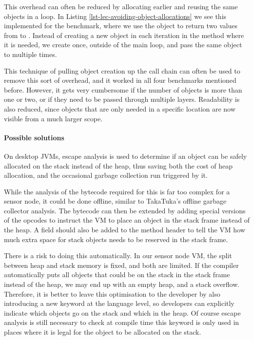 This overhead can often be reduced by allocating earlier and reusing the same objects in a loop. In Listing \ref{lst-lec-avoiding-object-allocations} we see this implemented for the  benchmark, where we use the  object to return two values from  to . Instead of creating a new object in each iteration in the  method where it is needed, we create  once, outside of the main loop, and pass the same object to  multiple times.

This technique of pulling object creation up the call chain can often be used to remove this sort of overhead, and it worked in all four benchmarks mentioned before. However, it gets very cumbersome if the number of objects is more than one or two, or if they need to be passed through multiple layers. Readability is also reduced, since objects that are only needed in a specific location are now visible from a much larger scope.

\paragraph{Possible solutions}
On desktop JVMs, escape analysis \cite{Choi:1999uw, Goetz:2005uy} is used to determine if an object can be safely allocated on the stack instead of the heap, thus saving both the cost of heap allocation, and the occasional garbage collection run triggered by it.

While the analysis of the bytecode required for this is far too complex for a sensor node, it could be done offline, similar to TakaTuka's offline garbage collector analysis. The bytecode can then be extended by adding special versions of the  opcodes to instruct the VM to place an object in the stack frame instead of the heap. A field should also be added to the method header to tell the VM how much extra space for stack objects needs to be reserved in the stack frame.

There is a risk to doing this automatically. In our sensor node VM, the split between heap and stack memory is fixed, and both are limited. If the compiler automatically puts all objects that could be on the stack in the stack frame instead of the heap, we may end up with an empty heap, and a stack overflow. Therefore, it is better to leave this optimisation to the developer by also introducing a new keyword at the language level, so developers can explicitly indicate which objects go on the stack and which in the heap. Of course escape analysis is still necessary to check at compile time this keyword is only used in places where it is legal for the object to be allocated on the stack.




